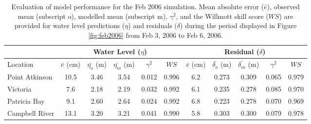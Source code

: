 \documentclass[pdftex,10pt]{article}
\begin{document}
\begin{table}[h]
\centering 
\begin{tabular}{|l |c c c c c | c c c c c|} 
\hline 
& \multicolumn{5}{|c|}{Water Level ($\eta$)}        & \multicolumn{5}{|c|}{Residual ($\delta$)} \\ 
\hline 
Location       & $\bar{e}$ (cm) & $\bar{\eta_{o}}$ (m) & $\bar{\eta_{m}}$ (m) & $\gamma^2$ & $WS$   & $\bar{e}$ (cm) & $\bar{\delta_{o}}$ (m) & $\bar{\delta_{m}}$ (m) & $\gamma^2$ & $WS$ \\
\hline 
Point Atkinson & 10.5           & 3.46                 & 3.54                 &   0.012    & 0.996  & 6.2            &  0.273                 & 0.309                  & 0.065     & 0.979     \\
Victoria       &  7.6           & 2.18                 & 2.19                 &   0.032    & 0.992  & 6.1            &  0.235                 & 0.278                  & 0.085     & 0.970     \\
Patricia Bay   &  9.1           & 2.60                 & 2.64                 &   0.024    & 0.992  & 6.8            &  0.223                 & 0.278                  & 0.070     & 0.969     \\
Campbell River & 13.1           & 3.20                 & 3.21                 &   0.041    & 0.990  & 5.8            &  0.303                 & 0.300                  & 0.079     & 0.978     \\
\hline 
\end{tabular}
\caption{Evaluation of model performance for the Feb 2006 simulation. Mean absolute error ($\bar{e}$), observed mean (subscript o), modelled mean (subscript m), $\gamma^2$, and the Willmott skill score ($WS$) are provided for water level predictions ($\eta$) and residuals ($\delta$) during the period displayed in Figure \ref{fig:feb2006} from Feb 3, 2006 to Feb 6, 2006.}
\label{tab:feb2006stat} 
\end{table} 
\end{document}
